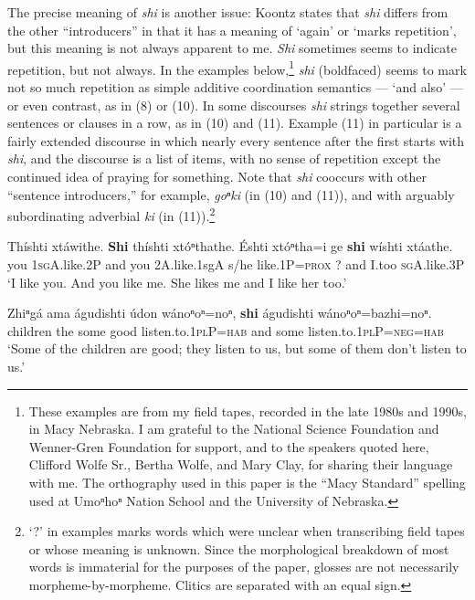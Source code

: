 \documentclass[output=paper]{LSP/langsci}
\begin{document}
The precise meaning of \textit{shi} is another issue:  Koontz states that \textit{shi} differs from the other ``introducers'' in that it has a meaning of `again' or `marks repetition', but this meaning is not always apparent to me. \textit{Shi} sometimes seems to indicate repetition, but not always.  In the examples below,\footnote{These examples are from my field tapes, recorded in the late 1980s and 1990s, in Macy Nebraska. I am grateful to the National Science Foundation and Wenner-Gren Foundation for support, and to the speakers quoted here, Clifford Wolfe Sr., Bertha Wolfe, and Mary Clay, for sharing their language with me. The orthography used in this paper is the ``Macy Standard'' spelling used at Umoⁿhoⁿ Nation School and the University of Nebraska.}   \textit{shi} (boldfaced) seems to mark not so much repetition as simple additive coordination semantics --- `and also' --- or even contrast, as in (8) or (10).  In some discourses \textit{shi} strings together several sentences or clauses in a row, as in (10) and (11).  Example (11) in particular is a fairly extended discourse in which nearly every sentence after the first starts with \textit{shi}, and the discourse is a list of items, with no sense of repetition except the continued idea of praying for something. Note that \textit{shi} cooccurs with other ``sentence introducers,'' for example, \textit{goⁿki} (in (10) and (11)), and with arguably subordinating adverbial \textit{ki} (in (11)).\footnote{`?' in examples marks words which were unclear when transcribing field tapes or whose meaning is unknown. Since the morphological breakdown of most words is immaterial for the purposes of the paper, glosses are not necessarily morpheme-by-morpheme. Clitics are separated with an equal sign.}

\ea
\gll Th\'ishti  xt\'awithe.  \textbf{Shi} th\'ishti xt\'oⁿthathe.  \'Eshti  xt\'oⁿtha=i  ge \textbf{shi}  w\'ishti xt\'aathe.\\
 	you   	\textsc{1sgA}.like.2P  and 	you     	2A.like.{1sgA}  	s/he   	like.1P=\textsc{prox}  	?  	and  	I.too  	\textsc{sgA}.like.3P\\
\trans `I like you.  And you like me.  She likes me and I like her too.'

\ex 
\gll  Zhiⁿg\'a  ama \'agudishti \'udon  w\'anoⁿoⁿ=noⁿ, \textbf{shi}  \'agudishti  w\'anoⁿoⁿ=bazhi=noⁿ.\\
children 	the 	some        	good  	listen.to.\textsc{1plP=hab} 	and some listen.to.\textsc{1plP}=\textsc{neg=hab}\\
\trans `Some of the children are good; they listen to us, but some of them don't listen to us.'
\end{document}
